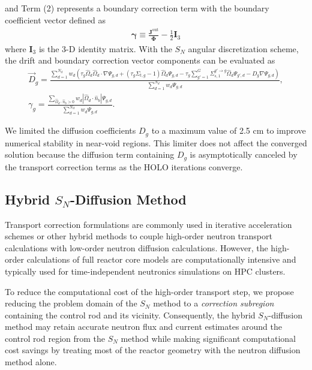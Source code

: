 %
and Term (2) represents a boundary correction term with the boundary coefficient vector defined as
%
\begin{gather}
  \bm{\gamma} \equiv \frac{\bm{J}^\text{out}}{\bm{\Phi}}-\frac{1}{2}\bm{I}_3
\end{gather}
where $\bm{I}_3$ is the 3-D identity matrix.
With the $S_N$ angular discretization scheme, the drift and boundary correction vector components
can be evaluated as
%
\begin{gather}
  \vec{D}_g = \frac{\sum^{N_d}_{d=1}w_d\left(\tau_g\hat{\Omega}_d\hat{\Omega}_d\cdot\nabla\Psi_{g,d}
  + \left(\tau_g\Sigma_{t,g}-1\right)\hat{\Omega}_d\Psi_{g,d}
  - \tau_g\sum^G_{g'=1}\Sigma^{g'\rightarrow g}_{s,1}\hat{\Omega}_d\Psi_{g',d}
  - D_g\nabla\Psi_{g,d}\right)}{\sum^{N_d}_{d=1}w_d\Psi_{g,d}}, \label{eq:drift} \\
  \gamma_g =
  \frac{\sum_{\hat{\Omega}_d\cdot\hat{n}_b > 0}w_d |\hat{\Omega}_d\cdot\hat{n}_b |
  \Psi_{g,d}}{\sum^{N_d}_{d=1}w_d\Psi_{g,d}}. \label{eq:bound-coef}
\end{gather}

We limited the diffusion coefficients $D_g$ to a maximum value of 2.5 cm to improve numerical
stability in near-void regions.
This limiter does not affect the converged solution because the diffusion term containing $D_g$ is
asymptotically canceled by the transport correction terms as the \gls{HOLO} iterations converge.

\subsection{Hybrid $S_N$-Diffusion Method} \label{sec:hybrid-algorithm}

Transport correction formulations are commonly used in
iterative acceleration schemes or other hybrid methods to couple high-order neutron transport
calculations with low-order neutron diffusion calculations. However, the high-order calculations of
full reactor core models are computationally intensive and typically used for
time-independent neutronics simulations on \gls{HPC} clusters.

To reduce the computational cost of the high-order transport step, we propose reducing the
problem domain of the $S_N$ method to a \textit{correction subregion} containing the control rod
and its vicinity. Consequently, the hybrid $S_N$-diffusion method may retain accurate neutron flux
and current estimates around the control rod region from the $S_N$ method while making significant
computational cost savings by treating most of the reactor geometry with the neutron diffusion
method alone.


